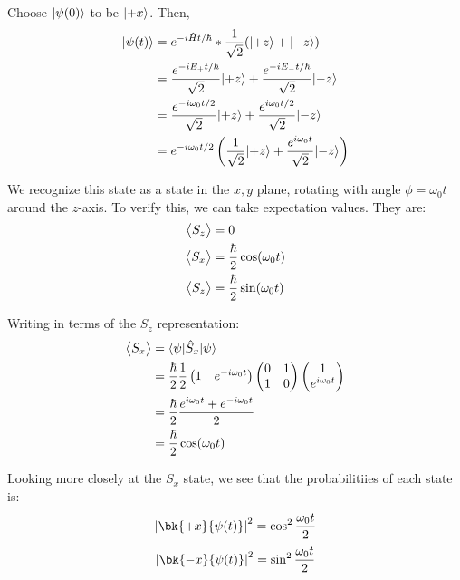 Choose \(\lvert\psi(0)\rangle\) to be \(\lvert+x\rangle\). Then,
\begin{align*}
	\lvert\psi(t)\rangle &= e^{-i\hat{H}t/\hbar}*\frac{1}{\sqrt{2}}(\lvert+z\rangle+\lvert-z\rangle)\\
		  &=\frac{e^{-iE_+t/\hbar}}{\sqrt{2}}\lvert+z\rangle+\frac{e^{-iE_-t/\hbar}}{\sqrt{2}}\lvert-z\rangle\\
		  &=\frac{e^{-i\omega_0 t/2}}{\sqrt{2}}\lvert+z\rangle+\frac{e^{i\omega_0t/2}}{\sqrt{2}}\lvert-z\rangle\\
		  &=e^{-i\omega_0t/2}\left(\frac{1}{\sqrt{2}}\lvert+z\rangle+\frac{e^{i\omega_0t}}{\sqrt{2}}\lvert-z\rangle\right)
\end{align*}

We recognize this state as a state in the \(x,y\) plane, rotating with angle \(\phi=\omega_0t\) around the \(z\)-axis.
To verify this, we can take expectation values. They are:
\begin{subequations}
	\begin{align}
		\left\langle \begin{matrix}S_z\end{matrix} \right\rangle&=0\\
		\left\langle \begin{matrix}S_x\end{matrix} \right\rangle&=\frac{\hbar}{2}\cos(\omega_0t)\\
		\left\langle \begin{matrix}S_z\end{matrix} \right\rangle&=\frac{\hbar}{2}\sin(\omega_0t)
	\end{align}
\end{subequations}
\newpage
\begin{aside}[\(S_x\) Expectation]
	Writing in terms of the \(S_z\) representation:
	\begin{align*}
		\left\langle \begin{matrix}S_x\end{matrix} \right\rangle&=\langle\psi\rvert \hat{S}_x \lvert\psi\rangle\\
			  &=\frac{\hbar}{2}\frac{1}{2} \begin{pmatrix}
				  1 & e^{-i\omega_0 t}
			  \end{pmatrix} \begin{pmatrix}
				  0 & 1 \\ 1 & 0
			  \end{pmatrix} \begin{pmatrix}
			  1\\e^{i\omega_0 t}
			  \end{pmatrix}\\
			  &=\frac{\hbar}{2}\frac{e^{i\omega_0t}+e^{-i\omega_0t}}{2}\\
			  &=\frac{\hbar}{2}\cos(\omega_0 t)
	\end{align*}
\end{aside}

Looking more closely at the \(S_x\) state, we see that the probabilitiies of each state is:
\[\abs{\bk{+x}{\p(t)}}^2=\cos^2\frac{\omega_0t}{2}\]
\[\abs{\bk{-x}{\p(t)}}^2=\sin^2\frac{\omega_0t}{2}\]

